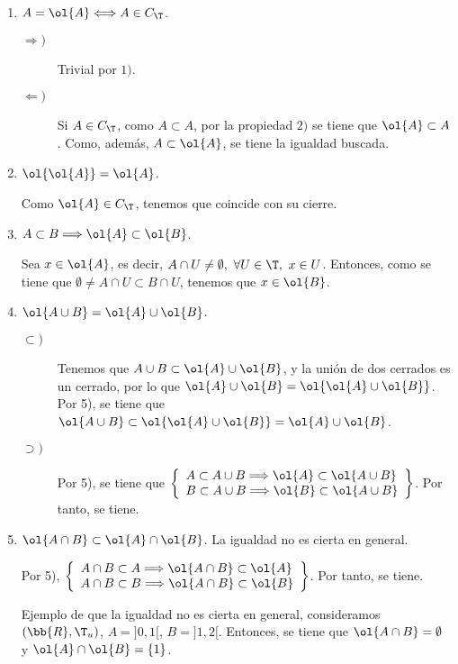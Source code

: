 \begin{enumerate}
    \item $A=\ol{A}\Longleftrightarrow A\in C_\T$.
    \begin{description}
        \item[$\Longrightarrow)$] Trivial por $1)$.
        \item[$\Longleftarrow)$] Si $A\in C_\T$, como $A\subset A$, por la propiedad $2)$ se tiene que $\ol{A}\subset A$. Como, además, $A\subset \ol{A}$, se tiene la igualdad buscada.
    \end{description}

    \item $\ol{\ol{A}}=\ol{A}$.

    Como $\ol{A}\in C_\T$, tenemos que coincide con su cierre.
    
    \item $A\subset B\Longrightarrow \ol{A}\subset \ol{B}$.

    Sea $x\in \ol{A}$, es decir, $A\cap U\neq \emptyset,~\forall U\in \T,~x\in U$. Entonces, como se tiene que $\emptyset\neq A\cap U\subset B\cap U$, tenemos que $x\in \ol{B}$.
    
    \item $\ol{A\cup B}=\ol{A}\cup \ol{B}$.
    \begin{description}
        \item[$\subset)$] Tenemos que $A\cup B\subset \ol{A}\cup \ol{B}$, y la unión de dos cerrados es un cerrado, por lo que $\ol{A}\cup \ol{B}=\ol{\ol{A}\cup \ol{B}}$. Por 5), se tiene que $\ol{A\cup B}\subset \ol{\ol{A}\cup \ol{B}}= \ol{A}\cup \ol{B}$.
        
        \item[$\supset)$] Por 5), se tiene que $\left\{\begin{array}{l}
            A\subset A\cup B\Longrightarrow \ol{A}\subset \ol{A\cup B} \\
            B\subset A\cup B\Longrightarrow \ol{B}\subset \ol{A\cup B} 
        \end{array}\right\}$. Por tanto, se tiene.
    \end{description}
    
    \item $\ol{A\cap B}\subset \ol{A}\cap \ol{B}$. La igualdad no es cierta en general.
    
    Por 5), $\left\{\begin{array}{l}
            A\cap B\subset A\Longrightarrow \ol{A\cap B}\subset \ol{A} \\
            A\cap B\subset B\Longrightarrow \ol{A\cap B}\subset \ol{B}
        \end{array}\right\}$. Por tanto, se tiene.

    Ejemplo de que la igualdad no es cierta en general, consideramos $(\bb{R},\T_u)$, $A=]0,1[$, $B=]1,2[$. Entonces, se tiene que $\ol{A\cap B}=\emptyset$ y $\ol{A}\cap \ol{B}=\{1\}$.
\end{enumerate}

